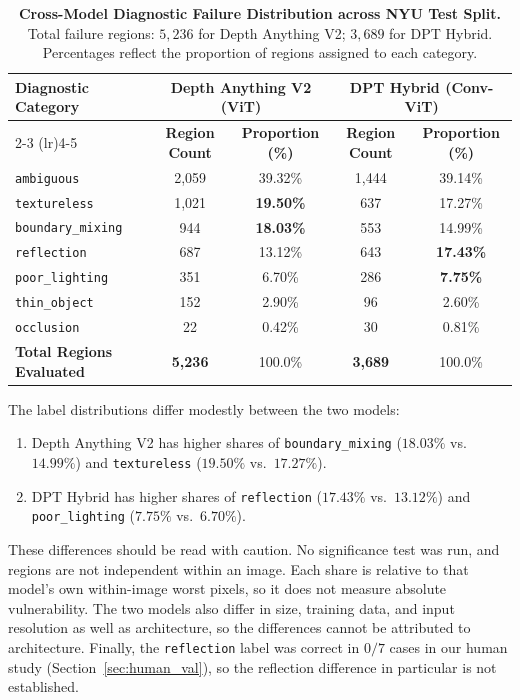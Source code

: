 \documentclass[11pt,a4paper]{article}
\begin{document}
\begin{table}[h]
\caption{\textbf{Cross-Model Diagnostic Failure Distribution across NYU Test Split.} Total failure regions: $5,236$ for Depth Anything V2; $3,689$ for DPT Hybrid. Percentages reflect the proportion of regions assigned to each category.}
\label{tab:cause_distribution}
\centering
\small
\begin{tabular}{@{}lcccc@{}}
\toprule
\multirow{2}{*}{\textbf{Diagnostic Category}} & \multicolumn{2}{c}{\textbf{Depth Anything V2 (ViT)}} & \multicolumn{2}{c}{\textbf{DPT Hybrid (Conv-ViT)}} \\
\cmidrule(lr){2-3} \cmidrule(lr){4-5}
& \textbf{Region Count} & \textbf{Proportion (\%)} & \textbf{Region Count} & \textbf{Proportion (\%)} \\
\midrule
\texttt{ambiguous} & 2,059 & 39.32\% & 1,444 & 39.14\% \\
\texttt{textureless} & 1,021 & \textbf{19.50\%} & 637 & 17.27\% \\
\texttt{boundary\_mixing} & 944 & \textbf{18.03\%} & 553 & 14.99\% \\
\texttt{reflection} & 687 & 13.12\% & 643 & \textbf{17.43\%} \\
\texttt{poor\_lighting} & 351 & 6.70\% & 286 & \textbf{7.75\%} \\
\texttt{thin\_object} & 152 & 2.90\% & 96 & 2.60\% \\
\texttt{occlusion} & 22 & 0.42\% & 30 & 0.81\% \\
\midrule
\textbf{Total Regions Evaluated} & \textbf{5,236} & 100.0\% & \textbf{3,689} & 100.0\% \\
\bottomrule
\end{tabular}
\end{table}

The label distributions differ modestly between the two models:
\begin{enumerate}
    \item Depth Anything V2 has higher shares of \texttt{boundary\_mixing} ($18.03\%$ vs.\ $14.99\%$) and \texttt{textureless} ($19.50\%$ vs.\ $17.27\%$).
    \item DPT Hybrid has higher shares of \texttt{reflection} ($17.43\%$ vs.\ $13.12\%$) and \texttt{poor\_lighting} ($7.75\%$ vs.\ $6.70\%$).
\end{enumerate}
These differences should be read with caution. No significance test was run, and regions are not independent within an image. Each share is relative to that model's own within-image worst pixels, so it does not measure absolute vulnerability. The two models also differ in size, training data, and input resolution as well as architecture, so the differences cannot be attributed to architecture. Finally, the \texttt{reflection} label was correct in $0/7$ cases in our human study (Section~\ref{sec:human_val}), so the reflection difference in particular is not established.
\end{document}
